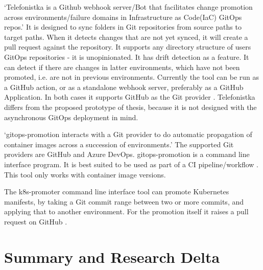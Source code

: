 
\enquote*{Telefonistka is a Github webhook server/Bot that facilitates change promotion across environments/failure domains in Infrastructure as Code(IaC) GitOps repos.}
\autocite{telefonistka}
It is designed to sync folders in Git repositories from source paths to target paths.
When it detects changes that are not yet synced,
it will create a pull request against the repository.
It supports any directory structure of users GitOps repositories -
it is unopinionated.
It has drift detection as a feature. It can detect if there are changes in
latter environments, which have not been promoted, i.e. are not in previous environments.
Currently the tool can be run as a GitHub action, or as a
standalone webhook server, preferably as a GitHub Application.
In both cases it supports GitHub as the Git provider
\autocite{telefonistka}.
Telefonistka differs from the proposed prototype of thesis,
because it is not designed with the asynchronous GitOps deployment in mind.


\enquote*{gitops-promotion interacts with a Git provider to do automatic propagation of container images across a succession of environments.}
\autocite{xenitABgitopsPromotion}
The supported Git providers are GitHub and Azure DevOps.
gitops-promotion is a command line interface program.
It is best suited to be used as part of a CI pipeline/workflow
\autocite{xenitABgitopsPromotion}.
This tool only works with container image versions.


The k8s-promoter command line interface tool can promote Kubernetes manifests, by
taking a Git commit range between two or more commits, and applying that to another environment.
For the promotion itself it raises a pull request on GitHub
\autocite{form3techK8sPromoter}.

\section*{Summary and Research Delta}

